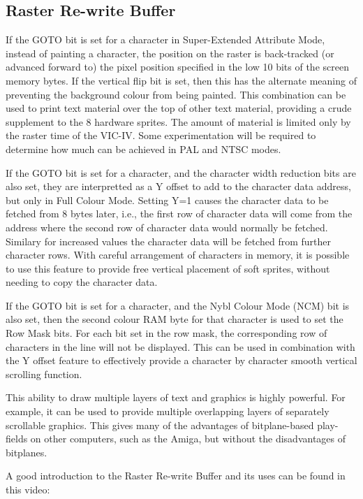 \subsection{Raster Re-write Buffer}

If the GOTO bit is set for a character in Super-Extended Attribute Mode, instead of painting a character, the position on the raster is back-tracked (or advanced forward to) the
pixel position specified in the low 10 bits of the screen memory bytes.  If the vertical flip bit is set, then this has the alternate
meaning of preventing the background colour from being painted.  This combination can be used to print text material over the top of
other text material, providing a crude supplement to the 8 hardware sprites.  The amount of material is limited only by the raster
time of the VIC-IV. Some experimentation will be required to determine how much can be achieved in PAL and NTSC modes.

If the GOTO bit is set for a character, and the character width reduction bits are also set, they are interpretted as a Y offset to add to the character data address, but only in Full Colour Mode.  Setting Y=1 causes the character data to be fetched from 8 bytes later, i.e., the first row of character data will come from the address where the second row of character data would normally be fetched.  Similary for increased values the character data will be fetched from further character rows.  With careful arrangement of characters in memory, it is possible to use this feature to provide free vertical placement of soft sprites, without needing to copy the character data.

If the GOTO bit is set for a character, and the Nybl Colour Mode (NCM) bit is also set, then the second colour RAM byte for that character is used to set the Row Mask bits. For each bit set in the row mask, the corresponding row of characters in the line will not be displayed. This can be used in combination with the Y offset feature to effectively provide a character by character smooth vertical scrolling function.

This ability to draw multiple layers of text and graphics is highly powerful. For example, it can be used to provide multiple overlapping
layers of separately scrollable graphics.  This gives many of the advantages of bitplane-based play-fields on other computers, such as the
Amiga, but without the disadvantages of bitplanes.

A good introduction to the Raster Re-write Buffer and its uses can be found in this video:

